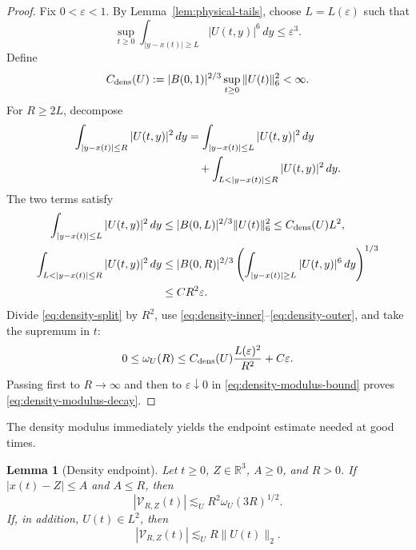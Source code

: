 \documentclass[preprint,12pt]{elsarticle}
\numberwithin{equation}{section}
\newtheorem{lemma}[theorem]{Lemma}
\theoremstyle{remark}
\newcommand{\R}{\mathbb R}
\newcommand{\dd}{\,d}
\newcommand{\Vcal}{\mathcal V}
\begin{document}
\begin{proof}
Fix $0<\varepsilon<1$.  By Lemma~\ref{lem:physical-tails}, choose $L=L(\varepsilon)$ such that
\begin{equation*}
  \sup_{t\ge0}
  \int_{|y-x(t)|\ge L}|U(t,y)|^6\dd y
  \le\varepsilon^3.
\end{equation*}
Define
\begin{equation*}
  C_{\rm dens}(U):=|B(0,1)|^{2/3}
  \sup_{t\ge0}\|U(t)\|_6^2<\infty.
\end{equation*}
For $R\ge2L$, decompose
\begin{align}
  \int_{|y-x(t)|\le R}|U(t,y)|^2\dd y
  &=\int_{|y-x(t)|\le L}|U(t,y)|^2\dd y\notag\\
  &\quad+
  \int_{L<|y-x(t)|\le R}|U(t,y)|^2\dd y.
  \label{eq:density-split}
\end{align}
The two terms satisfy
\begin{align}
  \int_{|y-x(t)|\le L}|U(t,y)|^2\dd y
  &\le |B(0,L)|^{2/3}\|U(t)\|_6^2
  \le C_{\rm dens}(U)L^2,
  \label{eq:density-inner}\\
  \int_{L<|y-x(t)|\le R}|U(t,y)|^2\dd y
  &\le |B(0,R)|^{2/3}
  \left(\int_{|y-x(t)|\ge L}|U(t,y)|^6\dd y\right)^{1/3}\notag\\
  &\le C R^2\varepsilon.
  \label{eq:density-outer}
\end{align}
Divide \eqref{eq:density-split} by $R^2$, use \eqref{eq:density-inner}--\eqref{eq:density-outer}, and take the supremum in $t$:
\begin{equation}\label{eq:density-modulus-bound}
  0\le\omega_U(R)
  \le C_{\rm dens}(U)\frac{L(\varepsilon)^2}{R^2}+C\varepsilon.
\end{equation}
Passing first to $R\to\infty$ and then to $\varepsilon\downarrow0$ in \eqref{eq:density-modulus-bound} proves \eqref{eq:density-modulus-decay}.
\end{proof}

The density modulus immediately yields the endpoint estimate needed at good times.

\begin{lemma}[Density endpoint]\label{lem:density-endpoint}
Let $t\ge0$, $Z\in\R^3$, $A\ge0$, and $R>0$. If $|x(t)-Z|\le A$ and $A\le R$, then
\begin{equation}\label{eq:density-endpoint}
  |\Vcal_{R,Z}(t)|
  \lesssim_U R^2\omega_U(3R)^{1/2}.
\end{equation}
If, in addition, $U(t)\in L^2$, then
\begin{equation}\label{eq:finite-mass-endpoint}
  |\Vcal_{R,Z}(t)|
  \lesssim_U R\|U(t)\|_2.
\end{equation}
\end{lemma}
\end{document}
